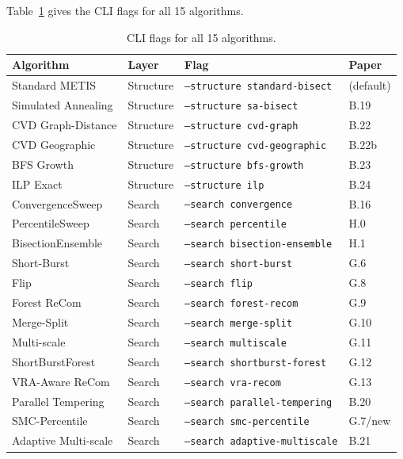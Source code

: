 Table~\ref{tab:cli} gives the CLI flags for all 15 algorithms.

\begin{table}[ht]
\centering
\caption{CLI flags for all 15 algorithms.}
\label{tab:cli}
\small
\begin{tabular}{@{}llll@{}}
\toprule
Algorithm & Layer & Flag & Paper \\
\midrule
Standard METIS       & Structure & \texttt{--structure standard-bisect}    & (default) \\
Simulated Annealing  & Structure & \texttt{--structure sa-bisect}           & B.19 \\
CVD Graph-Distance   & Structure & \texttt{--structure cvd-graph}           & B.22 \\
CVD Geographic       & Structure & \texttt{--structure cvd-geographic}      & B.22b \\
BFS Growth           & Structure & \texttt{--structure bfs-growth}          & B.23 \\
ILP Exact            & Structure & \texttt{--structure ilp}                 & B.24 \\
\midrule
ConvergenceSweep     & Search & \texttt{--search convergence}           & B.16 \\
PercentileSweep      & Search & \texttt{--search percentile}            & H.0 \\
BisectionEnsemble    & Search & \texttt{--search bisection-ensemble}    & H.1 \\
Short-Burst          & Search & \texttt{--search short-burst}           & G.6 \\
Flip                 & Search & \texttt{--search flip}                  & G.8 \\
Forest ReCom         & Search & \texttt{--search forest-recom}          & G.9 \\
Merge-Split          & Search & \texttt{--search merge-split}           & G.10 \\
Multi-scale          & Search & \texttt{--search multiscale}            & G.11 \\
ShortBurstForest     & Search & \texttt{--search shortburst-forest}     & G.12 \\
VRA-Aware ReCom      & Search & \texttt{--search vra-recom}             & G.13 \\
Parallel Tempering   & Search & \texttt{--search parallel-tempering}    & B.20 \\
SMC-Percentile       & Search & \texttt{--search smc-percentile}        & G.7/new \\
Adaptive Multi-scale & Search & \texttt{--search adaptive-multiscale}   & B.21 \\
\bottomrule
\end{tabular}
\end{table}

